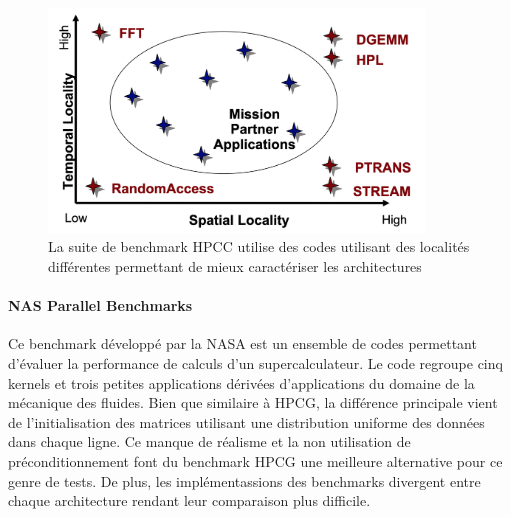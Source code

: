 \begin{figure}
    \center
    \includegraphics[width=10cm]{images/bench_hpcc.png}
    \caption{ La suite de benchmark HPCC utilise des codes utilisant des localités différentes permettant de mieux caractériser les architectures
    \label{pic_bench_hpcc}}
\end{figure}





\paragraph{NAS Parallel Benchmarks} Ce benchmark développé par la NASA est un ensemble de codes permettant d'évaluer la performance de calculs d'un supercalculateur. Le code regroupe cinq kernels et trois petites applications dérivées d'applications du domaine de la mécanique des fluides. Bien que similaire à HPCG, la différence principale vient de l'initialisation des matrices utilisant une distribution uniforme des données dans chaque ligne. Ce manque de réalisme et la non utilisation de préconditionnement font du benchmark HPCG une meilleure alternative pour ce genre de tests. De plus, les implémentassions des benchmarks divergent entre chaque architecture rendant leur comparaison plus difficile.




